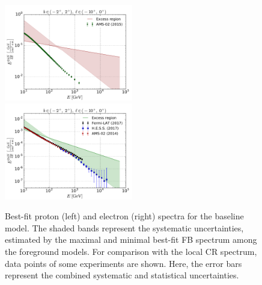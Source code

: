 \begin{figure}[h]
\includegraphics[width=0.5\textwidth]{plots/Summary_proton_spectra_0.pdf}
\includegraphics[width=0.5\textwidth]{plots/Summary_electron_spectra_0.pdf}
  	\caption{Best-fit proton (left) and electron (right) spectra for the baseline model. 
	The shaded bands represent the systematic uncertainties, 
	estimated by the maximal and minimal best-fit FB spectrum among the foreground models. 
	For comparison with the local CR spectrum, data points of some experiments are shown. 
	Here, the error bars represent the combined systematic and statistical uncertainties.}
  	\label{fig:Particle_spectra}
\end{figure}

